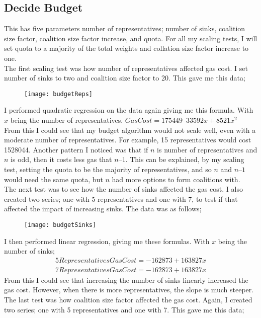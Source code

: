 \subsection{Decide Budget}
This has five parameters number of representatives; number of sinks, coalition size factor, coalition size factor increase, and quota. For all my scaling tests, I will set quota to a majority of the total weights and collation size factor increase to one. \\
The first scaling test was how number of representatives affected gas cost. I set number of sinks to two and coalition size factor to 20. This gave me this data;
\begin{figure}[H]
\texttt{[image: budgetReps]}
\end{figure}
I performed quadratic regression on the data again giving me this formula.  With $x$ being the number of representatives.
$Gas Cost = 175449 – 33592x + 8521x^2$ \\
From this I could see that my budget algorithm would not scale well, even with a moderate number of representatives. For example, 15 representatives would cost 1528044.
Another pattern I noticed was that if $n$ is number of representatives and $n$ is odd, then it costs less gas that $n – 1$. This can be explained, by my scaling test, setting the quota to be the majority of representatives, and so $n$ and $n – 1$ would need the same quota, but $n$ had more options to form coalitions with. \\
The next test was to see how the number of sinks affected the gas cost. I also created two series; one with 5 representatives and one with 7, to test if that affected the impact of increasing sinks. The data was as follows; \\
\begin{figure}[H]
\texttt{[image: budgetSinks]}
\end{figure}
I then performed linear regression, giving me these formulas.  With $x$ being the number of sinks;
\begin{gather*}
5 Representatives Gas Cost = -162873 + 163827x \\
7 Representatives Gas Cost = -162873 + 163827x
\end{gather*}
From this I could see that increasing the number of sinks linearly increased the gas cost. However, when there is more representatives, the slope is much steeper. \\
The last test was how coalition size factor affected the gas cost. Again, I created two series; one with 5 representatives and one with 7. This gave me this data;\\
